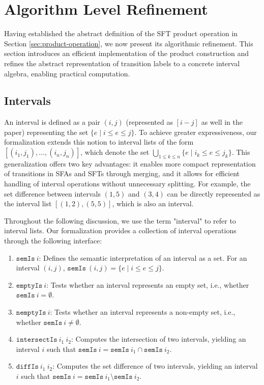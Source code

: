 \documentclass[sigplan,10pt,anonymous,review]{acmart}\settopmatter{printfolios=true,printccs=false,printacmref=false}
\begin{document}
\section{Algorithm Level Refinement}
\label{sec_alg_refinement}
Having established the abstract definition of the SFT product operation in Section \ref{sec:product-operation}, we now present its algorithmic refinement. This section introduces an efficient implementation of the product construction and refines the abstract representation of transition labels to a concrete interval algebra, enabling practical computation.


\subsection{Intervals}

An interval is defined as a pair $(i, j)$ (represented as $[i-j]$ as well in the paper) representing the set $\{e \mid i \leq e \leq j\}$. To achieve greater expressiveness, our formalization extends this notion to interval lists of the form $[(i_1, j_1), \ldots, (i_n, j_n)]$, which denote the set $\bigcup_{1\leq k\leq n}\{e \mid i_k \leq e \leq j_k\}$. This generalization offers two key advantages: it enables more compact representation of transitions in SFAs and SFTs through merging, and it allows for efficient handling of interval operations without unnecessary splitting. For example, the set difference between intervals $(1, 5)$ and $(3, 4)$ can be directly represented as the interval list $[(1, 2), (5, 5)]$, which is also an interval.


Throughout the following discussion, we use the term "interval" to refer to interval lists. Our formalization provides a collection of interval operations through the following interface:

\begin{enumerate}
  \item $\texttt{semIs}~i$: Defines the semantic interpretation of an interval as a set. For an interval $(i,j)$, $\texttt{semIs}~(i,j) = \{e \mid i \leq e \leq j\}$.
  \item $\texttt{emptyIs}~i$: Tests whether an interval represents an empty set, i.e., whether $\texttt{semIs}~i = \emptyset$.
  \item $\texttt{nemptyIs}~i$: Tests whether an interval represents a non-empty set, i.e., whether $\texttt{semIs}~i \neq \emptyset$.
  \item $\texttt{intersectIs}~i_1~i_2$: Computes the intersection of two intervals, yielding an interval $i$ such that $\texttt{semIs}~i = \texttt{semIs}~i_1 \cap \texttt{semIs}~i_2$.
  \item $\texttt{diffIs}~i_1~i_2$: Computes the set difference of two intervals, yielding an interval $i$ such that $\texttt{semIs}~i = \texttt{semIs}~i_1 \setminus \texttt{semIs}~i_2$.
\end{enumerate}
\end{document}
